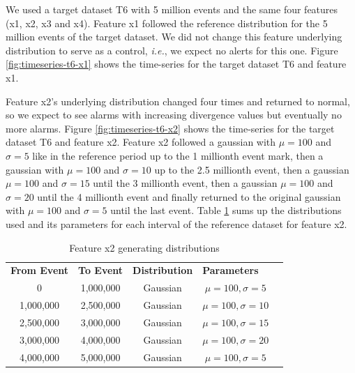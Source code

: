 We used a target dataset T6 with 5 million events and the same four features (x1, x2, x3 and x4). Feature x1 followed the reference distribution for the 5 million events of the target dataset. We did not change this feature underlying distribution to serve as a control, \textit{i.e.}, we expect no alerts for this one. Figure \ref{fig:timeseries-t6-x1} shows the time-series for the target dataset T6 and feature x1.

Feature x2's underlying distribution changed four times and returned to normal, so we expect to see alarms with increasing divergence values but eventually no more alarms. Figure \ref{fig:timeseries-t6-x2} shows the time-series for the target dataset T6 and feature x2. Feature x2 followed a gaussian with $\mu=100$ and $\sigma=5$ like in the reference period up to the 1 millionth event mark, then a gaussian with $\mu=100$ and $\sigma=10$ up to the 2.5 millionth event, then a gaussian $\mu=100$ and $\sigma=15$ until the 3 millionth event, then a gaussian $\mu=100$ and $\sigma=20$ until the 4 millionth event and finally returned to the original gaussian with $\mu=100$ and $\sigma=5$ until the last event. Table \ref{tbl:multi-feat-x2-changes} sums up the distributions used and its parameters for each interval of the reference dataset for feature x2.
\begin{table}[!htb]
    \begin{center}
    \begin{tabular}{|c|c|c|c|l}
    \cline{1-4}
    \textbf{From Event} & \textbf{To Event} & \textbf{Distribution} & \multicolumn{1}{l|}{\textbf{Parameters}} &  \\ \cline{1-4}
    0                   & 1,000,000         & Gaussian              & $\mu=100, \sigma=5$                      &  \\ \cline{1-4}
    1,000,000           & 2,500,000         & Gaussian              & $\mu=100, \sigma=10$                     &  \\ \cline{1-4}
    2,500,000           & 3,000,000         & Gaussian              & $\mu=100, \sigma=15$                     &  \\ \cline{1-4}
    3,000,000           & 4,000,000         & Gaussian              & $\mu=100, \sigma=20$                      &  \\ \cline{1-4}
    4,000,000           & 5,000,000         & Gaussian              & $\mu=100, \sigma=5$                      &  \\ \cline{1-4}
    \end{tabular}
    \end{center}
    \caption{Feature x2 generating distributions}
    \label{tbl:multi-feat-x2-changes}
\end{table}

